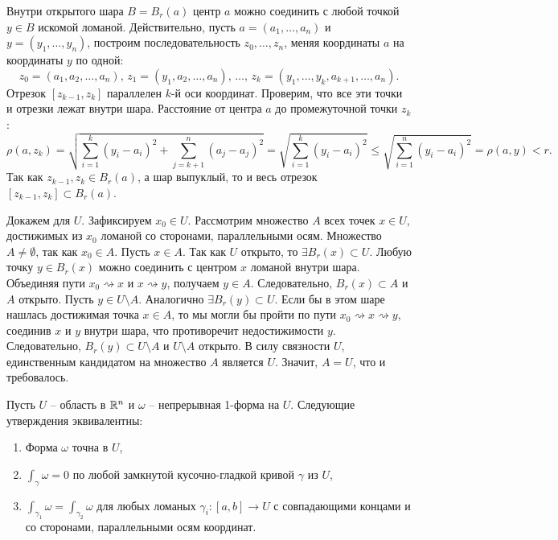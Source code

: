 \begin{myproof}
	Внутри открытого шара $B = B_r(a)$ центр $a$ можно соединить с любой точкой $y \in B$ искомой ломаной.
	Действительно, пусть $a = (a_1, \dots, a_n)$ и $y = (y_1, \dots, y_n)$, построим последовательность $z_0, \dots, z_n$, меняя координаты $a$ на координаты $y$ по одной:
	\[ z_0 = (a_1, a_2, \dotsc, a_n), \, z_1 = (y_1, a_2, \dots, a_n), \, \dotsc, \, z_k = (y_1, \dots, y_k, a_{k+1}, \dots, a_n). \]
	Отрезок $[z_{k-1}, z_k]$ параллелен $k$-й оси координат. Проверим, что все эти точки и отрезки лежат внутри шара.
	Расстояние от центра $a$ до промежуточной точки $z_k$:
	\[ \rho(a, z_k) = \sqrt{\sum_{i=1}^k (y_i - a_i)^2 + \sum_{j=k+1}^n (a_j - a_j)^2} = \sqrt{\sum_{i=1}^k (y_i - a_i)^2} \le \sqrt{\sum_{i=1}^n (y_i - a_i)^2} = \rho(a, y) < r. \]
	Так как $z_{k-1}, z_k \in B_r(a)$, а шар выпуклый, то и весь отрезок $[z_{k-1}, z_k] \subset B_r(a)$.
	
	\vspace{5pt}
	Докажем для $U$. Зафиксируем $x_0 \in U$. Рассмотрим множество $A$ всех точек $x \in U$, достижимых из $x_0$ ломаной со сторонами, параллельными осям.
	Множество $A \neq \emptyset$, так как $x_0 \in A$.
	Пусть $x \in A$. Так как $U$ открыто, то $\exists B_r(x) \subset U$. Любую точку $y \in B_r(x)$ можно соединить с центром $x$ ломаной внутри шара. Объединяя пути $x_0 \rightsquigarrow x$ и $x \rightsquigarrow y$, получаем $y \in A$. Следовательно, $B_r(x) \subset A$ и $A$ открыто.
	Пусть $y \in U \setminus A$. Аналогично $\exists B_r(y) \subset U$. Если бы в этом шаре нашлась достижимая точка $x \in A$, то мы могли бы пройти по пути $x_0 \rightsquigarrow x \rightsquigarrow y$, соединив $x$ и $y$ внутри шара, что противоречит недостижимости $y$. Следовательно, $B_r(y) \subset U \setminus A$ и $U \setminus A$ открыто.
	В силу связности $U$, единственным кандидатом на множество $A$ является $U$. Значит, $A=U$, что и требовалось.
\end{myproof}

\begin{theorem}
	Пусть $U$ -- область в $\mathbb{R}^n$ и $\omega$ -- непрерывная 1-форма на $U$. Следующие утверждения эквивалентны: 
	\begin{enumerate}[itemsep = 0pt, topsep = 5pt]
		\item Форма $\omega$ точна в $U$, 
		\item $\int_{\gamma} \omega = 0$ по любой замкнутой кусочно-гладкой кривой $\gamma$ из $U$, 
		\item $\int_{\gamma_1} \omega = \int_{\gamma_2} \omega$ для любых ломаных $\gamma_i : [a, b] \to U$ с совпадающими концами и со сторонами, параллельными осям координат.
	\end{enumerate}
\end{theorem}

